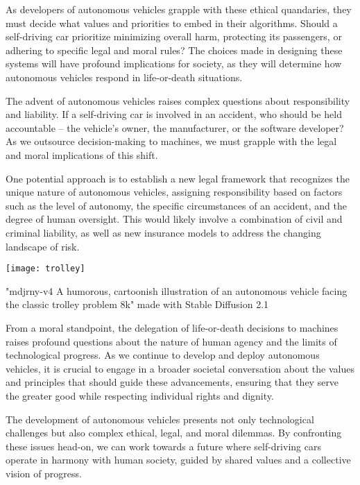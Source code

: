 As developers of autonomous vehicles grapple with these ethical quandaries, they must decide what values and priorities to embed in their algorithms. Should a self-driving car prioritize minimizing overall harm, protecting its passengers, or adhering to specific legal and moral rules? The choices made in designing these systems will have profound implications for society, as they will determine how autonomous vehicles respond in life-or-death situations.

The advent of autonomous vehicles raises complex questions about responsibility and liability. If a self-driving car is involved in an accident, who should be held accountable – the vehicle's owner, the manufacturer, or the software developer? As we outsource decision-making to machines, we must grapple with the legal and moral implications of this shift.

One potential approach is to establish a new legal framework that recognizes the unique nature of autonomous vehicles, assigning responsibility based on factors such as the level of autonomy, the specific circumstances of an accident, and the degree of human oversight. This would likely involve a combination of civil and criminal liability, as well as new insurance models to address the changing landscape of risk.

\begin{marginfigure}[-5.5cm]
        \texttt{[image: trolley]}
        \caption{"mdjrny-v4 A humorous, cartoonish illustration of an autonomous vehicle facing the classic trolley problem 8k" made with Stable Diffusion 2.1}
\end{marginfigure}

From a moral standpoint, the delegation of life-or-death decisions to machines raises profound questions about the nature of human agency and the limits of technological progress. As we continue to develop and deploy autonomous vehicles, it is crucial to engage in a broader societal conversation about the values and principles that should guide these advancements, ensuring that they serve the greater good while respecting individual rights and dignity.

The development of autonomous vehicles presents not only technological challenges but also complex ethical, legal, and moral dilemmas. By confronting these issues head-on, we can work towards a future where self-driving cars operate in harmony with human society, guided by shared values and a collective vision of progress.

